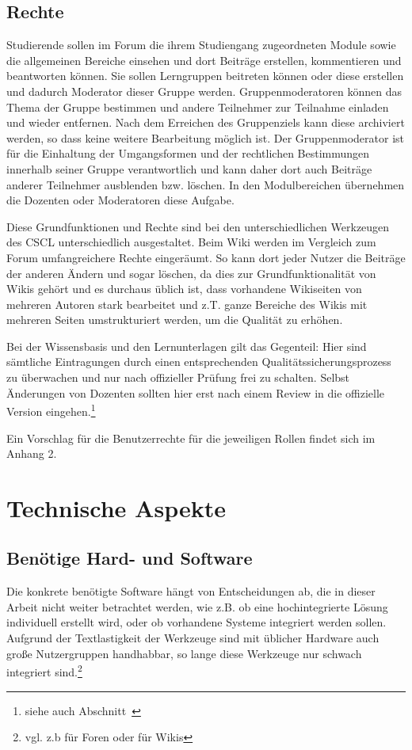 \subsection{Rechte} %
\label{sub:rechte}
Studierende sollen im Forum die ihrem Studiengang zugeordneten Module sowie die allgemeinen Bereiche einsehen und dort Beiträge erstellen, kommentieren und beantworten können. Sie sollen Lerngruppen beitreten können oder diese erstellen und dadurch Moderator dieser Gruppe werden. Gruppenmoderatoren können das Thema der Gruppe bestimmen und andere Teilnehmer zur Teilnahme einladen und wieder entfernen. Nach dem Erreichen des Gruppenziels kann diese archiviert werden, so dass keine weitere Bearbeitung möglich ist. Der Gruppenmoderator ist für die Einhaltung der Umgangsformen und der rechtlichen Bestimmungen innerhalb seiner Gruppe verantwortlich und kann daher dort auch Beiträge anderer Teilnehmer ausblenden bzw. löschen. In den Modulbereichen übernehmen die Dozenten oder Moderatoren diese Aufgabe.

Diese Grundfunktionen und Rechte sind bei den unterschiedlichen Werkzeugen des \ac{CSCL} unterschiedlich ausgestaltet. Beim Wiki werden im Vergleich zum Forum umfangreichere Rechte eingeräumt. So kann dort jeder Nutzer die Beiträge der anderen Ändern und sogar löschen, da dies zur Grundfunktionalität von Wikis gehört und es durchaus üblich ist, dass vorhandene Wikiseiten von mehreren Autoren stark bearbeitet und z.T. ganze Bereiche des Wikis mit mehreren Seiten umstrukturiert werden, um die Qualität zu erhöhen. 

Bei der Wissensbasis und den Lernunterlagen gilt das Gegenteil: Hier sind sämtliche Eintragungen durch einen entsprechenden Qualitätssicherungsprozess zu überwachen und nur nach offizieller Prüfung frei zu schalten. Selbst Änderungen von Dozenten sollten hier erst nach einem Review in die offizielle Version eingehen.\footnote{siehe auch Abschnitt~}

Ein Vorschlag für die Benutzerrechte für die jeweiligen Rollen findet sich im Anhang 2.


\newpage
\section{Technische Aspekte} %
\label{sec:technische_und_wirtschaftliche_aspekte}

\subsection{Benötige Hard- und Software} %
\label{sub:benotige_hard_und_software}
Die konkrete benötigte Software hängt von Entscheidungen ab, die in dieser Arbeit nicht weiter betrachtet werden, wie z.B. ob eine hochintegrierte Lösung individuell erstellt wird, oder ob vorhandene Systeme integriert werden sollen. Aufgrund der Textlastigkeit der Werkzeuge sind mit üblicher Hardware auch große Nutzergruppen handhabbar, so lange diese Werkzeuge nur schwach integriert sind.\footnote{vgl. z.b \cite{phpbblarge} für Foren oder \cite{dwlarge} für Wikis}

